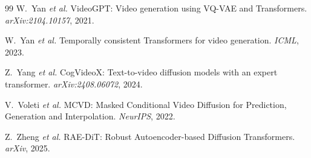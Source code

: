 \documentclass{article}
\begin{document}
\begin{thebibliography}{99}
W.~Yan \textit{et al.}
\newblock VideoGPT: Video generation using VQ-VAE and Transformers.
\newblock \textit{arXiv:2104.10157}, 2021.

W.~Yan \textit{et al.}
\newblock Temporally consistent Transformers for video generation.
\newblock \textit{ICML}, 2023.

Z.~Yang \textit{et al.}
\newblock CogVideoX: Text-to-video diffusion models with an expert transformer.
\newblock \textit{arXiv:2408.06072}, 2024.

V.~Voleti \textit{et al.}
\newblock MCVD: Masked Conditional Video Diffusion for Prediction, Generation and Interpolation.
\newblock \textit{NeurIPS}, 2022.

Z.~Zheng \textit{et al.}
\newblock RAE-DiT: Robust Autoencoder-based Diffusion Transformers.
\newblock \textit{arXiv}, 2025.

\end{thebibliography}
\end{document}
